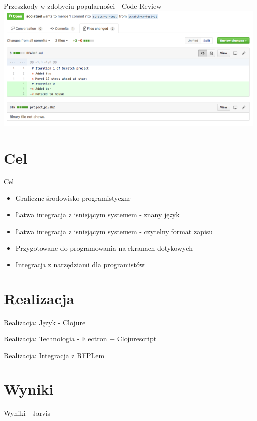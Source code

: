 \documentclass[presentation]{beamer}
\begin{document}
\begin{frame}[label=sec-1-8]{Przeszkody w zdobyciu popularności - Code Review}
\includegraphics[width=.9\linewidth]{./img/scratch-cr.png}
\end{frame}
\section{Cel}
\label{sec-2}
\begin{frame}[label=sec-2-1]{Cel}
\begin{itemize}
\item Graficzne środowisko programistyczne
\item Łatwa integracja z isniejącym systemem - znany język
\item Łatwa integracja z isniejącym systemem - czytelny format zapisu
\item Przygotowane do programowania na ekranach dotykowych
\item Integracja z narzędziami dla programistów
\end{itemize}
\end{frame}
\section{Realizacja}
\label{sec-3}
\begin{frame}[label=sec-3-1]{Realizacja: Język - Clojure}
\end{frame}
\begin{frame}[label=sec-3-2]{Realizacja: Technologia - Electron + Clojurescript}
\end{frame}
\begin{frame}[label=sec-3-3]{Realizacja: Integracja z REPLem}
\end{frame}
\section{Wyniki}
\label{sec-4}
\begin{frame}[label=sec-4-1]{Wyniki - Jarvis}
\end{frame}
\end{document}
